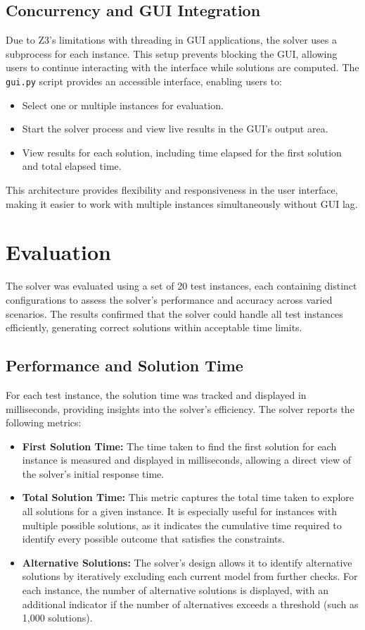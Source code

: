 \documentclass[a4paper]{article}
\begin{document}
    \subsection{Concurrency and GUI Integration}
    Due to Z3's limitations with threading in GUI applications, the solver uses a subprocess for each instance. This setup prevents blocking the GUI, allowing users to continue interacting with the interface while solutions are computed. The \texttt{gui.py} script provides an accessible interface, enabling users to:
    \begin{itemize}
        \item Select one or multiple instances for evaluation.
        \item Start the solver process and view live results in the GUI’s output area.
        \item View results for each solution, including time elapsed for the first solution and total elapsed time.
    \end{itemize}
    
    This architecture provides flexibility and responsiveness in the user interface, making it easier to work with multiple instances simultaneously without GUI lag.
    

    \section{Evaluation}
    The solver was evaluated using a set of 20 test instances, each containing distinct configurations to assess the solver’s performance and accuracy across varied scenarios. The results confirmed that the solver could handle all test instances efficiently, generating correct solutions within acceptable time limits.
    
    \subsection{Performance and Solution Time}
    For each test instance, the solution time was tracked and displayed in milliseconds, providing insights into the solver’s efficiency. The solver reports the following metrics:
    \begin{itemize}
        \item \textbf{First Solution Time:} The time taken to find the first solution for each instance is measured and displayed in milliseconds, allowing a direct view of the solver’s initial response time.
        \item \textbf{Total Solution Time:} This metric captures the total time taken to explore all solutions for a given instance. It is especially useful for instances with multiple possible solutions, as it indicates the cumulative time required to identify every possible outcome that satisfies the constraints.
        \item \textbf{Alternative Solutions:} The solver’s design allows it to identify alternative solutions by iteratively excluding each current model from further checks. For each instance, the number of alternative solutions is displayed, with an additional indicator if the number of alternatives exceeds a threshold (such as 1,000 solutions).
    \end{itemize}
    
\end{document}
